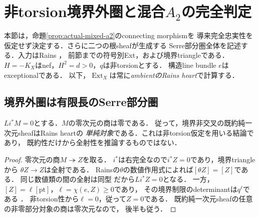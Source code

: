 \section{非torsion境界外圏と混合\texorpdfstring{$A_2$}{A2}の完全判定}
\label{sec:mixed-a2-category}
本節は，命題\ref{prop:actual-mixed-a2}のconnecting morphismを
導来完全忠実性を仮定せず決定する．さらに二つの根sheafが生成する
Serre部分圏全体を記述する．入力はRains
\cite[Corollaries 7.7, 7.13, 7.15, Propositions 7.6, 7.32,
Corollary 10.12, Proposition 10.13]{RainsBirational}，
前節までの符号別Ext，および境界triangleである．
$H=-K_X$はnef，$H^2=d>0$，$q$は非torsionとする．
構造line bundle $e$はexceptionalである．
以下，$\operatorname{Ext}_X$は常に\emph{ambientのRains heart}で計算する．

\subsection{境界外圏は有限長のSerre部分圏}
\begin{lemma}[零次元の境界外対象と商の排除]
\label{lem:offboundary-no-points}
$Li^*M=0$とする．$M$の零次元の商は零である．
従って，境界非交叉の既約純一次元sheafはRains heartの
\emph{単純対象}である．これは非torsion仮定を用いる結論であり，
既約性だけから全射性を推論するものではない．
\end{lemma}
\begin{proof}
零次元の商$M\twoheadrightarrow Z$を取る．
$i^*$は右完全なので$i^*Z=0$であり，境界triangleから
$\theta Z\to Z$は全射である．
Rainsの$\theta$の数値作用式によれば$[\theta Z]=[Z]$である．
同じ数値類の間の全射は同型
\cite[Corollary 7.7]{RainsBirational}だから$Li^*Z=0$となる．
一方，$[Z]=\ell[\mathrm{pt}]$，$\ell=\chi(e,Z)\ge0$であり，
その境界制限のdeterminantは$q^\ell$である
\cite[Proposition 7.6, \S7, Proposition 7.24の直前]{RainsBirational}．
非torsion性から$\ell=0$，従って$Z=0$である．
既約純一次元sheafの任意の非零部分対象の商は零次元なので，
後半も従う．
\end{proof}

